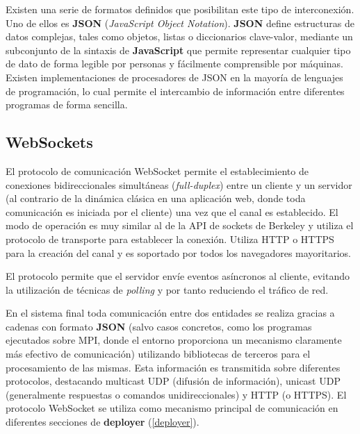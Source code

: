 Existen una serie de formatos definidos que posibilitan este tipo de interconexión. Uno de ellos es \textbf{JSON} (\textit{JavaScript Object Notation})\cite{rfc7159}. \textbf{JSON} define estructuras de datos complejas, tales como objetos, listas o diccionarios clave-valor, mediante un subconjunto de la sintaxis de \textbf{JavaScript} que permite representar cualquier tipo de dato de forma legible por personas y fácilmente comprensible por máquinas. Existen implementaciones de procesadores de JSON en la mayoría de lenguajes de programación, lo cual permite el intercambio de información entre diferentes programas de forma sencilla.

\subsection{WebSockets}

El protocolo de comunicación WebSocket \cite{rfc6455} permite el establecimiento de conexiones bidireccionales simultáneas (\textit{full-duplex}) entre un cliente y un servidor (al contrario de la dinámica clásica en una aplicación web, donde toda comunicación es iniciada por el cliente) una vez que el canal es establecido. El modo de operación es muy similar al de la API de sockets de Berkeley y utiliza el protocolo de transporte para establecer la conexión. Utiliza HTTP o HTTPS para la creación del canal y es soportado por todos los navegadores mayoritarios.

El protocolo permite que el servidor envíe eventos asíncronos al cliente, evitando la utilización de técnicas de \textit{polling} y por tanto reduciendo el tráfico de red. 

\vspace{2cm}

En el sistema final toda comunicación entre dos entidades se realiza gracias a cadenas con formato \textbf{JSON} (salvo casos concretos, como los programas ejecutados sobre MPI, donde el entorno proporciona un mecanismo claramente más efectivo de comunicación) utilizando bibliotecas de terceros para el procesamiento de las mismas. Esta información es transmitida sobre diferentes protocolos, destacando multicast UDP (difusión de información), unicast UDP (generalmente respuestas o comandos unidireccionales) y HTTP (o HTTPS). El protocolo WebSocket se utiliza como mecanismo principal de comunicación en diferentes secciones de \textbf{deployer} (\ref{deployer}).

